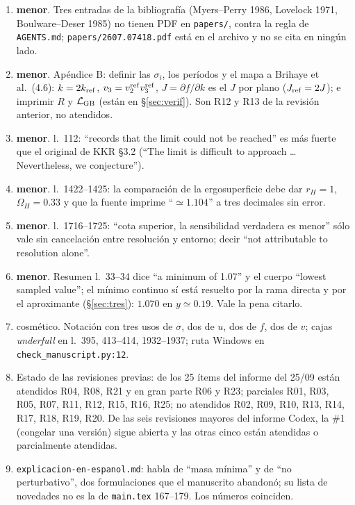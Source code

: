 \documentclass[10pt,a4paper]{article}
\newcommand{\MEN}{\textbf{menor}}
\newcommand{\COS}{cosmético}
\newcommand{\code}[1]{\texttt{#1}}
\begin{document}
\begin{enumerate}[label=M\arabic*.,leftmargin=2.4em]
 \ldots by two orders of magnitude or more''. Cocientes incremento/dispersión: 11.7, 19.1, 17.9,
 46.7 en los cuatro primeros acoplamientos, luego $>10^3$.
\item \MEN. Tres entradas de la bibliografía (Myers--Perry 1986, Lovelock 1971,
 Boulware--Deser 1985) no tienen PDF en \code{papers/}, contra la regla de \code{AGENTS.md};
 \code{papers/2607.07418.pdf} está en el archivo y no se cita en ningún lado.
\item \MEN. Apéndice B: definir las $\sigma_i$, los períodos y el mapa a Brihaye et al.\ (4.6):
 $k=2k_{\rm ref}$, $v_3=v_2^{\rm ref}v_3^{\rm ref}$, $J=\partial f/\partial k$ es el $J$ por plano
 ($J_{\rm ref}=2J$); e imprimir $R$ y $\mathcal L_{\rm GB}$ (están en \S\ref{sec:verif}). Son R12 y
 R13 de la revisión anterior, no atendidos.
\item \MEN. l.~112: ``records that the limit could not be reached'' es más fuerte que el original
 de KKR \S3.2 (``The limit is difficult to approach \ldots Nevertheless, we conjecture'').
\item \MEN. l.~1422--1425: la comparación de la ergosuperficie debe dar $r_H=1$, $\Omega_H=0.33$ y
 que la fuente imprime ``$\simeq1.104$'' a tres decimales sin error.
\item \MEN. l.~1716--1725: ``cota superior, la sensibilidad verdadera es menor'' sólo vale sin
 cancelación entre resolución y entorno; decir ``not attributable to resolution alone''.
\item \MEN. Resumen l.~33--34 dice ``a minimum of 1.07'' y el cuerpo ``lowest sampled value''; el
 mínimo continuo sí está resuelto por la rama directa y por el aproximante (\S\ref{sec:tres}):
 $1.070$ en $y\simeq0.19$. Vale la pena citarlo.
\item \COS. Notación con tres usos de $\sigma$, dos de $u$, dos de $f$, dos de $v$; cajas
 \emph{underfull} en l.~395, 413--414, 1932--1937; ruta Windows en \code{check\_manuscript.py:12}.
\item Estado de las revisiones previas: de los 25 ítems del informe del 25/09 están atendidos
 R04, R08, R21 y en gran parte R06 y R23; parciales R01, R03, R05, R07, R11, R12, R15, R16, R25;
 no atendidos R02, R09, R10, R13, R14, R17, R18, R19, R20. De las seis revisiones mayores del
 informe Codex, la \#1 (congelar una versión) sigue abierta y las otras cinco están atendidas o
 parcialmente atendidas.
\item \code{explicacion-en-espanol.md}: habla de ``masa mínima'' y de ``no perturbativo'', dos
 formulaciones que el manuscrito abandonó; su lista de novedades no es la de \code{main.tex}
 167--179. Los números coinciden.
\end{enumerate}
\end{document}
